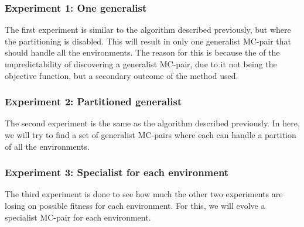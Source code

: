         \subsubsection{Experiment 1: One generalist}
            The first experiment is similar to the algorithm described previously, but where the partitioning is disabled. This will result in only one generalist MC-pair that should handle all the environments. The reason for this is because the of the unpredictability of discovering a generalist MC-pair, due to it not being the objective function, but a secondary outcome of the method used.
        \subsubsection{Experiment 2: Partitioned generalist}
            The second experiment is the same as the algorithm described previously. In here, we will try to find a set of generalist MC-pairs where each can handle a partition of all the environments. 
        \subsubsection{Experiment 3: Specialist for each environment}
            The third experiment is done to see how much the other two experiments are losing on possible fitness for each environment. For this, we will evolve a specialist MC-pair for each environment.